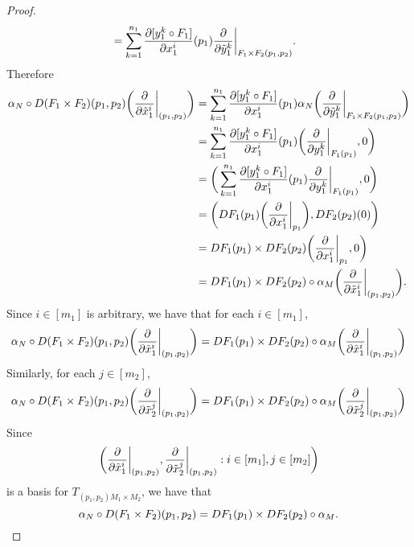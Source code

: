 \documentclass{book}
\begin{document}
\begin{proof}
\begin{align*}
			& = \sum_{k=1}^{n_1} \frac{\partial [y^k_1 \circ F_1]}{\partial x_1^i} (p_1) \frac{\partial }{\partial \tilde{y}^k_1} \bigg|_{F_1 \times F_2 (p_1, p_2)}.
		\end{align*}
		Therefore 
		\begin{align*}
			\alpha_N \circ D(F_1 \times F_2)(p_1, p_2) \bigg( \frac{\partial}{\partial \tilde{x}_1^i} \bigg|_{(p_1, p_2)} \bigg) 
			& = \sum_{k=1}^{n_1} \frac{\partial [y^k_1 \circ F_1]}{\partial x_1^i} (p_1) \alpha_N \bigg( \frac{\partial }{\partial \tilde{y}^k_1} \bigg|_{F_1 \times F_2 (p_1, p_2)} \bigg) \\
			& = \sum_{k=1}^{n_1} \frac{\partial [y^k_1 \circ F_1]}{\partial x_1^i} (p_1) \bigg( \frac{\partial }{\partial y^k_1} \bigg|_{F_1 (p_1)} , 0 \bigg) \\
			& = \bigg( \sum_{k=1}^{n_1} \frac{\partial [y^k_1 \circ F_1]}{\partial x_1^i} (p_1) \frac{\partial }{\partial y^k_1} \bigg|_{F_1 (p_1)} , 0 \bigg) \\
			& = \bigg( DF_1(p_1)\bigg( \frac{\partial}{\partial x_1^i} \bigg|_{p_1} \bigg), DF_2(p_2)(0)  \bigg) \\
			& = DF_1(p_1) \times DF_2(p_2) \bigg( \frac{\partial}{\partial x_1^i} \bigg|_{p_1}, 0 \bigg) \\
			& = DF_1(p_1) \times DF_2(p_2) \circ \alpha_M \bigg( \frac{\partial}{\partial \tilde{x}_1^i} \bigg|_{(p_1, p_2)} \bigg).
		\end{align*}
	Since $i \in [m_1]$ is arbitrary, we have that for each $i \in [m_1]$, 
	$$\alpha_N \circ D(F_1 \times F_2)(p_1, p_2) \bigg( \frac{\partial}{\partial \tilde{x}_1^i} \bigg|_{(p_1, p_2)} \bigg) = DF_1(p_1) \times DF_2(p_2) \circ \alpha_M \bigg( \frac{\partial}{\partial \tilde{x}_1^i} \bigg|_{(p_1, p_2)} \bigg)$$
	Similarly, for each $j \in [m_2]$, 
	$$\alpha_N \circ D(F_1 \times F_2)(p_1, p_2) \bigg( \frac{\partial}{\partial \tilde{x}_2^j} \bigg|_{(p_1, p_2)} \bigg) = DF_1(p_1) \times DF_2(p_2) \circ \alpha_M \bigg( \frac{\partial}{\partial \tilde{x}_2^j} \bigg|_{(p_1, p_2)}  \bigg)$$
	Since $$\bigg(  \frac{\partial}{\partial \tilde{x}_1^i} \bigg|_{(p_1, p_2)},  \frac{\partial}{\partial \tilde{x}_2^j} \bigg|_{(p_1, p_2)} : i \in [m_1], j \in [m_2]\bigg)$$
	is a basis for $T_{(p_1, p_2) M_1 \times M_2}$, we have that  
	$$\alpha_N \circ D(F_1 \times F_2)(p_1, p_2) = DF_1(p_1) \times DF_2(p_2) \circ \alpha_M.$$
	\end{proof}
\end{document}
